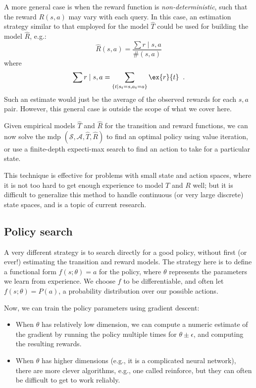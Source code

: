A more general case is when the reward function is {\em
  non-deterministic}, such that the reward $R(s, a)$ may vary with
each query.  In this case, an estimation strategy similar to that
employed for the model $\hat{T}$ could be used for building the model
$\hat{R}$, e.g.:
\begin{equation}
     \hat{R}(s,a) = \frac{\sum r \mid s, a}{\#(s,a)} 
\end{equation}
where 
\begin{equation}
\sum r \mid s, a = \sum_{\{t \mid s_t = s, a_t = a\}}
  \ex{r}{t}\;\;.
\end{equation}
Such an estimate would just be the average of the observed rewards for each $s, a$ pair.  
However, this general case is outside the scope of what we cover here.

Given empirical models $\hat{T}$ and $\hat{R}$ for the transition and reward functions,  
we can now solve the {\sc mdp} $(\mathcal S, \mathcal A, \hat{T}, \hat{R})$ 
to find an optimal policy using value iteration, or use a
finite-depth expecti-max search to find an action to take for a
particular state.

This technique is effective for problems with small state and action
spaces, where it is not too hard to get enough experience to model
$T$ and $R$ well; but it is difficult to generalize this method to
handle continuous (or very large discrete) state spaces, and is a
topic of current research.

\subsection{Policy search}
\label{sec:rl_policy_search}

A very different strategy is to search directly for a good policy,
without first (or ever!) estimating the transition and reward models.
The strategy here is to define a functional form $f(s;\theta) = a$ for
the policy, where $\theta$ represents the parameters we learn from
experience. We choose $f$ to be differentiable, and often let
$f(s;\theta) = P(a)$, a probability distribution over our possible
actions.

Now, we can train the policy parameters using gradient descent:
    \begin{itemize}
    \item When $\theta$ has relatively low dimension, we can compute a
      numeric estimate of the gradient by running the policy multiple
      times for $\theta \pm \epsilon$, and computing the resulting
      rewards.
      \item When $\theta$ has higher dimensions (e.g., it is a
        complicated neural network), there are more clever algorithms,
        e.g., one called {\sc reinforce}, but they can often be
        difficult to get to work reliably.
    \end{itemize}

